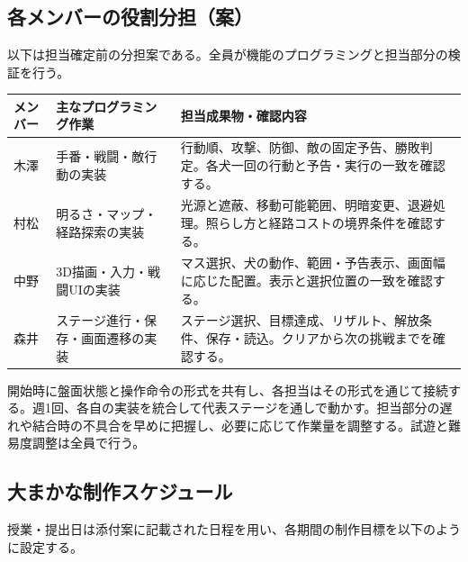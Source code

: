 \documentclass[a4paper,11pt,dvipdfmx]{jsarticle}
\begin{document}
\subsection{各メンバーの役割分担（案）}

以下は担当確定前の分担案である。全員が機能のプログラミングと担当部分の検証を行う。

{\small
\begin{longtable}{@{}P{0.20\dimexpr{}\tabcolsep\relax}P{0.34\dimexpr{}\tabcolsep\relax}P{0.46\dimexpr{}\tabcolsep\relax}@{}}
\toprule
\textbf{メンバー} & \textbf{主なプログラミング作業} & \textbf{担当成果物・確認内容} \\
\midrule
\endhead
木澤 & 手番・戦闘・敵行動の実装 & 行動順、攻撃、防御、敵の固定予告、勝敗判定。各犬一回の行動と予告・実行の一致を確認する。 \\
村松 & 明るさ・マップ・経路探索の実装 & 光源と遮蔽、移動可能範囲、明暗変更、退避処理。照らし方と経路コストの境界条件を確認する。 \\
中野 & 3D描画・入力・戦闘UIの実装 & マス選択、犬の動作、範囲・予告表示、画面幅に応じた配置。表示と選択位置の一致を確認する。 \\
森井 & ステージ進行・保存・画面遷移の実装 & ステージ選択、目標達成、リザルト、解放条件、保存・読込。クリアから次の挑戦までを確認する。 \\
\bottomrule
\end{longtable}
}

開始時に盤面状態と操作命令の形式を共有し、各担当はその形式を通じて接続する。週1回、各自の実装を統合して代表ステージを通しで動かす。担当部分の遅れや結合時の不具合を早めに把握し、必要に応じて作業量を調整する。試遊と難易度調整は全員で行う。

\subsection{大まかな制作スケジュール}

授業・提出日は添付案に記載された日程を用い、各期間の制作目標を以下のように設定する。
\end{document}
